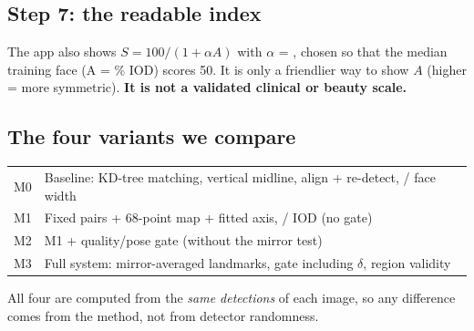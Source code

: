 \subsection{Step 7: the readable index}
The app also shows $S = 100/(1+\alpha A)$ with $\alpha$ = \alphaIndex{}, chosen so that the
median training face (A = \trainMedian\% IOD) scores 50. It is only a friendlier way to show
$A$ (higher = more symmetric). \textbf{It is not a validated clinical or beauty scale.}

\subsection{The four variants we compare}
\begin{center}
\begin{tabular}{@{}lp{11.5cm}@{}}
\toprule
M0 & Baseline: KD-tree matching, vertical midline, align + re-detect, / face width\\
M1 & Fixed pairs + 68-point map + fitted axis, / IOD (no gate)\\
M2 & M1 + quality/pose gate (without the mirror test)\\
M3 & Full system: mirror-averaged landmarks, gate including $\delta$, region validity\\
\bottomrule
\end{tabular}
\end{center}
All four are computed from the \emph{same detections} of each image, so any difference comes
from the method, not from detector randomness.


